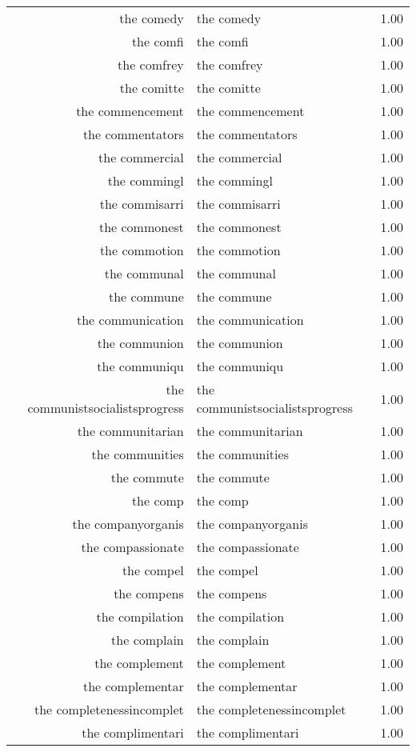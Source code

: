 \begin{table}[ht]
\begin{tabular}{rlr}
  the comedy & the comedy & 1.00 \\ 
  the comfi & the comfi & 1.00 \\ 
  the comfrey & the comfrey & 1.00 \\ 
  the comitte & the comitte & 1.00 \\ 
  the commencement & the commencement & 1.00 \\ 
  the commentators & the commentators & 1.00 \\ 
  the commercial & the commercial & 1.00 \\ 
  the commingl & the commingl & 1.00 \\ 
  the commisarri & the commisarri & 1.00 \\ 
  the commonest & the commonest & 1.00 \\ 
  the commotion & the commotion & 1.00 \\ 
  the communal & the communal & 1.00 \\ 
  the commune & the commune & 1.00 \\ 
  the communication & the communication & 1.00 \\ 
  the communion & the communion & 1.00 \\ 
  the communiqu & the communiqu & 1.00 \\ 
  the communistsocialistsprogress & the communistsocialistsprogress & 1.00 \\ 
  the communitarian & the communitarian & 1.00 \\ 
  the communities & the communities & 1.00 \\ 
  the commute & the commute & 1.00 \\ 
  the comp & the comp & 1.00 \\ 
  the companyorganis & the companyorganis & 1.00 \\ 
  the compassionate & the compassionate & 1.00 \\ 
  the compel & the compel & 1.00 \\ 
  the compens & the compens & 1.00 \\ 
  the compilation & the compilation & 1.00 \\ 
  the complain & the complain & 1.00 \\ 
  the complement & the complement & 1.00 \\ 
  the complementar & the complementar & 1.00 \\ 
  the completenessincomplet & the completenessincomplet & 1.00 \\ 
  the complimentari & the complimentari & 1.00 \\ 

\end{tabular}
\end{table}
